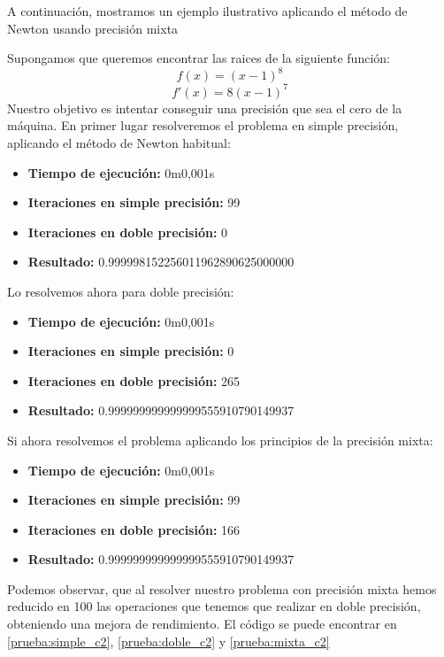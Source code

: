 A continuación, mostramos un ejemplo ilustrativo aplicando el método de Newton usando precisión mixta
\begin{ejemplo}
  Supongamos que queremos encontrar las raices de la siguiente función:
  \[
  f(x) = (x-1)^8
  \]
  \[
  f'(x) = 8 (x-1)^7
  \]
  Nuestro objetivo es intentar conseguir una precisión que sea el cero de la máquina. En primer lugar resolveremos el problema en simple precisión, aplicando el método de Newton habitual:
  \begin{itemize}
  \item \textbf{Tiempo de ejecución: } 0m0,001s
  \item \textbf{Iteraciones en simple precisión: } 99
  \item \textbf{Iteraciones en doble precisión: } 0
  \item \textbf{Resultado: } 0.999998152256011962890625000000
  \end{itemize}

  Lo resolvemos ahora para doble precisión:
  \begin{itemize}
  \item \textbf{Tiempo de ejecución: } 0m0,001s
  \item \textbf{Iteraciones en simple precisión: } 0
  \item \textbf{Iteraciones en doble precisión: } 265
  \item \textbf{Resultado: } 0.999999999999999555910790149937
  \end{itemize}

  Si ahora resolvemos el problema aplicando los principios de la precisión mixta:
  \begin{itemize}
  \item \textbf{Tiempo de ejecución: } 0m0,001s
  \item \textbf{Iteraciones en simple precisión: } 99
  \item \textbf{Iteraciones en doble precisión: } 166
  \item \textbf{Resultado: } 0.999999999999999555910790149937
  \end{itemize}

  Podemos observar, que al resolver nuestro problema con precisión mixta hemos reducido en 100 las operaciones que tenemos que realizar en doble precisión, obteniendo una mejora de rendimiento. El código se puede encontrar en \ref{prueba:simple_c2}, \ref{prueba:doble_c2} y \ref{prueba:mixta_c2}
\end{ejemplo}

